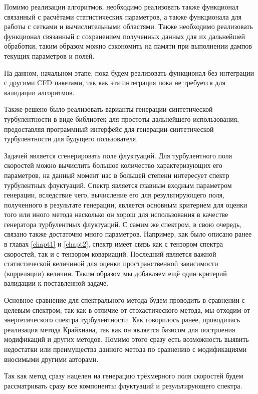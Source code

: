 Помимо реализации алгоритмов, необходимо реализовать также функционал связанный с расчётами статистических параметров, а также функционала для работы с сетками и вычислительными областями. Также необходимо реализовать функционал связанный с сохранением полученных данных для их дальнейшей обработки, таким образом можно сэкономить на памяти при выполнении дампов текущих параметров и полей. 

На данном, начальном этапе, пока будем реализовать функционал без интеграции с другими CFD пакетами, так как эта интеграция пока не требуется для валидации алгоритмов.

Также решено было реализовать варианты генерации синтетической турбулентности в виде библиотек для простоты дальнейшего использования, предоставляя программный интерфейс для генерации синтетической турбулентности для будущего пользователя. 

%
%
Задачей является сгенерировать поле флуктуаций. Для турбулентного поля скоростей можно вычислить большое количество характеризующих его параметров, на данный момент нас в большей степени интересует спектр турбулентных флуктуаций. Спектр является главным входным параметром генерации, вследствие чего, вычисление его для результирующего поля, полученного в результате генерации, является основным критерием для оценки того или иного метода насколько он хорош для использования в качестве генератора турбулентных флуктуаций. С самим же спектром, в свою очередь, связано также достаточно много параметров. Например, как было описано ранее в главах \ref{chapt1} и \ref{chapt2}, спектр имеет связь как с тензором спектра скоростей, так и с тензором ковариаций. Последний является важной статистической величиной для оценки пространственной зависимости (корреляции) величин. Таким образом мы добавляем ещё один критерий валидации к поставленной задаче. 

Основное сравнение для спектрального метода будем проводить в сравнении с целевым спектром, так как в отличие от стохастического метода, мы отходим от энергетического спектра турбулентности. Как говорилось ранее, проводилась реализация метода Крайхнана, так как он является базисом для построения модификаций и других методов. Помимо этого сразу есть возможность выявить недостатки или преимущества данного метода по сравнению с модификациями вносимыми другими авторами. 

Так как метод сразу нацелен на генерацию трёхмерного поля скоростей будем рассматривать сразу все компоненты флуктуаций и результирующего спектра. 

